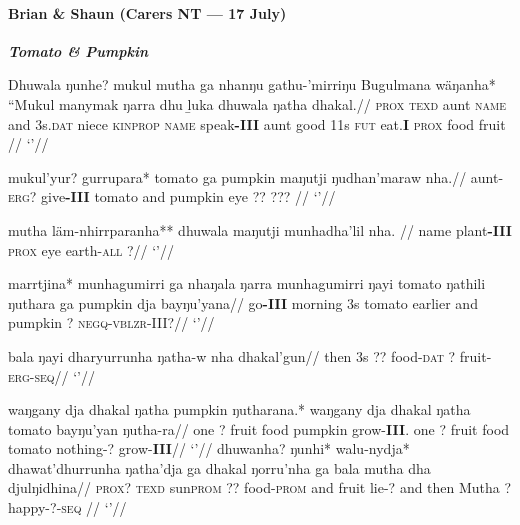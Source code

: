 \documentclass[10pt]{article}
\author{Josh}
\date{\today}
\begin{document}
\paragraph{Brian \& Shaun (Carers NT --- 17 July)}
\textbf{\textit{Tomato \& Pumpkin}}


	\ex\begingl\gla Dhuwala ŋunhe? mukul mutha ga nhanŋu gathu-'mirriŋu Bugulmana wäŋanha* ``Mukul manymak ŋarra dhu ḻuka dhuwala ŋatha dhakal.//
	\glb \textsc{prox} \textsc{texd} aunt \textsc{name} and 3s.\textsc{dat} niece \textsc{kinprop} \textsc{name} speak\textbf{-III} aunt good 11s \textsc{fut} eat.\textbf{I} \textsc{prox} food fruit  //
	\glft`'//\endgl\xe
	
	\ex\begingl\gla mukul'yur? gurrupara* tomato ga pumpkin maŋutji ŋudhan'maraw nha.//
	\glb aunt\textsc{-erg?} give\textbf{-III} tomato and pumpkin eye ?? ??? //
	\glft`'//\endgl\xe
	
	\ex\begingl\gla mutha läm-nhirrparanha** dhuwala maŋutji munhadha'lil nha.	//
	\glb name plant\textbf{-III} \textsc{prox} eye earth\textsc{-all} ?//
	\glft`'//\endgl\xe
	
	\ex\begingl\gla marrtjina* munhagumirri ga nhaŋala ŋarra munhagumirri ŋayi tomato ŋathili ŋuthara ga pumpkin dja bayŋu'yana//
	\glb go\textbf{-III} morning 3s tomato earlier and pumpkin ? \textsc{negq-vblzr-III?}//
	\glft `'//\endgl\xe
	
	\pex\begingl\gla bala ŋayi dharyurrunha ŋatha-w nha dhakal'gun//
	\glb then 3s ?? food\textsc{-dat} ? fruit-\textsc{erg-seq}//
	\glft`'//\endgl\xe
	
	\pex\begingl\gla waŋgany dja dhakal ŋatha pumpkin ŋutharana.* waŋgany dja dhakal ŋatha tomato bayŋu'yan ŋutha-ra//
	\glb one ? fruit food pumpkin grow-\textbf{III}. one ? fruit food tomato nothing\textsc{-?} grow-\textbf{III}//
	\glft`'//\endgl\xe
	\ex\begingl\gla dhuwanha? ŋunhi* walu-nydja* dhawat'dhurrunha ŋatha'dja ga dhakal ŋorru'nha ga bala mutha dha djulŋidhina//
	\glb \textsc{prox?} \textsc{texd} sun\textsc{prom} ?? food\textsc{-prom} and fruit lie-? and then Mutha \textsc{?} happy\textsc{-?-seq} //
	\glft`'//\endgl\xe
	
	
\end{document}
